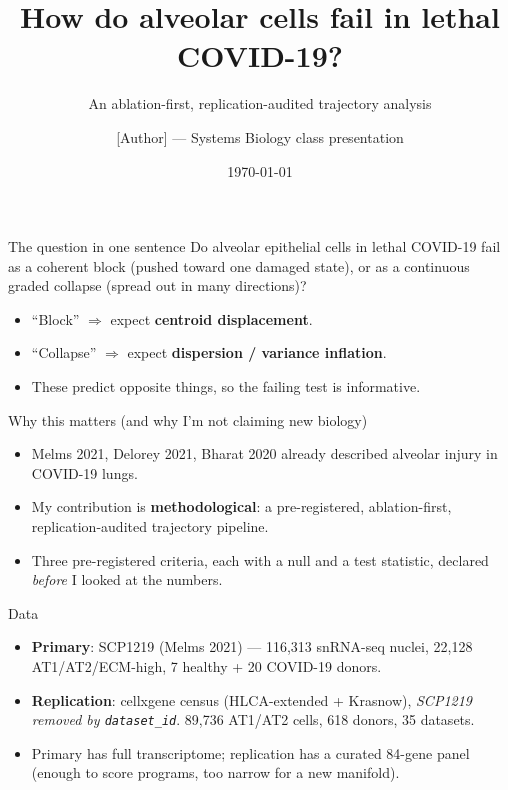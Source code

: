 \documentclass[aspectratio=169]{beamer}
\title{How do alveolar cells fail in lethal COVID-19?}
\subtitle{An ablation-first, replication-audited trajectory analysis}
\author{[Author] --- Systems Biology class presentation}
\date{\today}
\begin{document}
\maketitle

\begin{frame}{The question in one sentence}
\Large
Do alveolar epithelial cells in lethal COVID-19 fail as a \alert{coherent block}
(pushed toward one damaged state), or as a \alert{continuous graded collapse}
(spread out in many directions)?
\normalsize
\vspace{1em}
\begin{itemize}
  \item ``Block'' $\Rightarrow$ expect \textbf{centroid displacement}.
  \item ``Collapse'' $\Rightarrow$ expect \textbf{dispersion / variance inflation}.
  \item These predict opposite things, so the failing test is informative.
\end{itemize}
\end{frame}

\begin{frame}{Why this matters (and why I'm not claiming new biology)}
\begin{itemize}
  \item Melms 2021, Delorey 2021, Bharat 2020 already described alveolar
        injury in COVID-19 lungs.
  \item My contribution is \textbf{methodological}: a pre-registered,
        ablation-first, replication-audited trajectory pipeline.
  \item Three pre-registered criteria, each with a null and a test statistic,
        declared \emph{before} I looked at the numbers.
\end{itemize}
\end{frame}

\begin{frame}{Data}
\begin{itemize}
  \item \textbf{Primary}: SCP1219 (Melms 2021) --- 116{,}313 snRNA-seq nuclei,
        22{,}128 AT1/AT2/ECM-high, 7 healthy + 20 COVID-19 donors.
  \item \textbf{Replication}: cellxgene census (HLCA-extended + Krasnow),
        \emph{SCP1219 removed by \texttt{dataset\_id}}. 89{,}736 AT1/AT2 cells,
        618 donors, 35 datasets.
  \item Primary has full transcriptome; replication has a curated 84-gene
        panel (enough to score programs, too narrow for a new manifold).
\end{itemize}
\end{frame}
\end{document}
